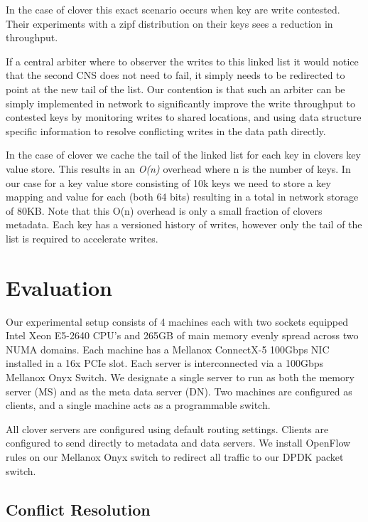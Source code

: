 In the case of clover this exact scenario occurs when key are write
contested. Their experiments with a zipf distribution on their keys
sees a  reduction in throughput.

If a central arbiter where to observer the writes to this linked list
it would notice that the second CNS does not need to fail, it simply
needs to be redirected to point at the new tail of the list. Our
contention is that such an arbiter can be simply implemented in network
to significantly improve the write throughput to contested keys by
monitoring writes to shared locations, and using data structure
specific information to resolve conflicting writes in the data path
directly.

In the case of clover we cache the tail of the linked list for each
key in clovers key value store. This results in an \textit{O(n)}
overhead where n is the number of keys. In our case for a key value
store consisting of 10k keys we need to store a key mapping and value
for each (both 64 bits) resulting in a total in network storage of
80KB. Note that this O(n) overhead is only a small fraction of clovers
metadata. Each key has a versioned history of writes, however only the
tail of the list is required to accelerate writes.

\section{Evaluation}

Our experimental setup consists of 4 machines each with two sockets
equipped Intel Xeon E5-2640 CPU's and 265GB of main memory evenly
spread across two NUMA domains. Each machine has a Mellanox ConnectX-5
100Gbps NIC installed in a 16x PCIe slot. Each server is
interconnected via a 100Gbps Mellanox Onyx Switch. We designate a
single server to run as both the memory server (MS) and as the meta
data server (DN). Two machines are configured as clients, and a single
machine acts as a programmable switch.

All clover servers are configured using default routing settings.
Clients are configured to send directly to metadata and data servers.
We install OpenFlow rules on our Mellanox Onyx switch to redirect all
traffic to our DPDK packet switch.

\subsection{Conflict Resolution}

